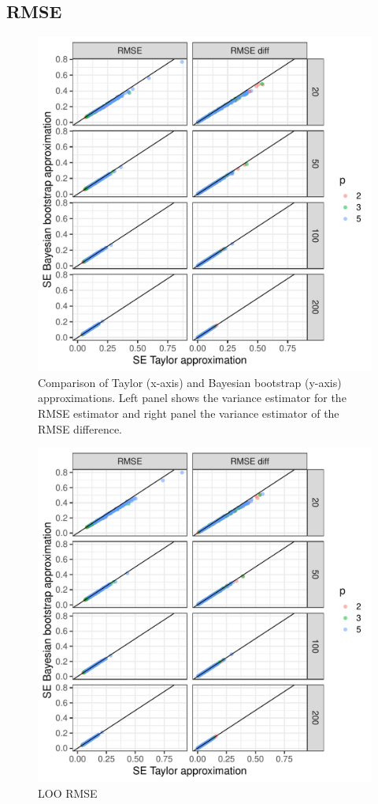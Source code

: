 \documentclass{article}
\begin{document}
\subsection{RMSE}
\begin{figure}[!htb]
    \centering
    \includegraphics[width=\textwidth]{figures/rmse.pdf}
    \caption{Comparison of Taylor (x-axis) and Bayesian bootstrap (y-axis) approximations. Left panel shows the variance estimator for the RMSE estimator and right panel the variance estimator of the RMSE difference.}
    \label{fig:rmse-plot}
\end{figure}

\begin{figure}[!htb]
    \centering
    \includegraphics[width=\textwidth]{figures/loo_rmse.pdf}
    \caption{LOO RMSE}
    \label{fig:loo-rmse-plot}
\end{figure}
\end{document}
